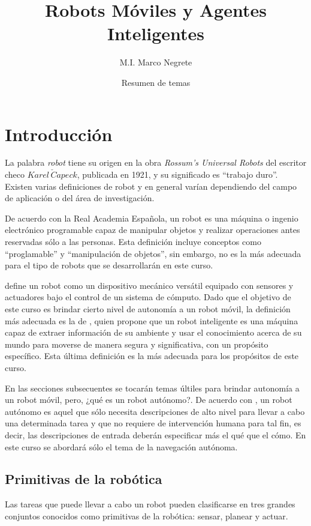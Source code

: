 \documentclass[a4paper]{article}
\title{Robots Móviles y Agentes Inteligentes}
\author{M.I. Marco Negrete}
\date{Resumen de temas}
\begin{document}
\renewcommand{\tablename}{Tabla}
\maketitle

\tableofcontents

\section{Introducción}

La palabra \textit{robot} tiene su origen en la obra \textit{Rossum's Universal Robots} del escritor checo $Karel \,\check{C}apeck$, publicada en 1921, y su significado es ``trabajo duro''. Existen varias definiciones de robot y en general varían dependiendo del campo de aplicación o del área de investigación. 

De acuerdo con la Real Academia Española, un robot es una máquina o ingenio electrónico programable capaz de manipular objetos y realizar operaciones antes reservadas sólo a las personas. Esta definición incluye conceptos como ``proglamable'' y ``manipulación de objetos'', sin embargo, no es la más adecuada para el tipo de robots que se desarrollarán en este curso. 

\cite{Latombe1991MotionPlanning} define un robot como un dispositivo mecánico versátil equipado con sensores y actuadores bajo el control de un sistema de cómputo. Dado que el objetivo de este curso es brindar cierto nivel de autonomía a un robot móvil, la definición más adecuada es la de \cite{Arkin1998BehBasedRobo}, quien propone que un robot inteligente es una máquina capaz de extraer información de su ambiente y usar el conocimiento acerca de su mundo para moverse de manera segura y significativa, con un propósito específico. Esta última definición es la más adecuada para los propósitos de este curso. 

En las secciones subsecuentes se tocarán temas últiles para brindar autonomía a un robot móvil, pero, ¿qué es un robot autónomo?. De acuerdo con \cite{Latombe1991MotionPlanning}, un robot autónomo es aquel que sólo necesita descripciones de alto nivel para llevar a cabo una determinada tarea y que no requiere de intervención humana para tal fin, es decir, las descripciones de entrada deberán especificar más el qué que el cómo. En este curso se abordará sólo el tema de la navegación autónoma. 

\subsection{Primitivas de la robótica}
Las tareas que puede llevar a cabo un robot pueden clasificarse en tres grandes conjuntos conocidos como primitivas de la robótica: sensar, planear y actuar. 
\end{document}
